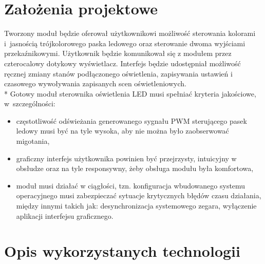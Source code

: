 \documentclass[12pt, eng, twoside, openany, final]{mgr}
\begin{document}
\chapter{Założenia projektowe}
\thispagestyle{fancy}  

    Tworzony moduł będzie oferował użytkownikowi możliwość sterowania kolorami i~jasnością trójkolorowego paska ledowego oraz sterowanie dwoma wyjściami przekaźnikowymi. Użytkownik będzie komunikował się z modułem przez czterocalowy dotykowy wyświetlacz. Interfejs będzie udostępniał możliwość ręcznej zmiany stanów podłączonego oświetlenia, zapisywania ustawień i czasowego wywoływania zapisanych scen oświetleniowych.\\*
    Gotowy moduł sterownika oświetlenia LED musi spełniać kryteria jakościowe, w~szczególności:
    \begin{itemize}
        \item częstotliwość odświeżania generowanego sygnału PWM sterującego pasek ledowy musi być na tyle wysoka, aby nie można było zaobserwować migotania,
        
        \item graficzny interfejs użytkownika powinien być przejrzysty, intuicyjny w obsłudze oraz na tyle responsywny, żeby
        obsługa modułu była komfortowa,
        
        \item moduł musi działać w ciągłości, tzn. konfiguracja wbudowanego systemu operacyjnego musi zabezpieczać sytuacje
        krytycznych błędów czasu działania, między innymi takich jak: desynchronizacja systemowego zegara, wyłączenie aplikacji interfejsu graficznego.
    \end{itemize}
%
\chapter{Opis wykorzystanych technologii}
\thispagestyle{fancy}
\end{document}
